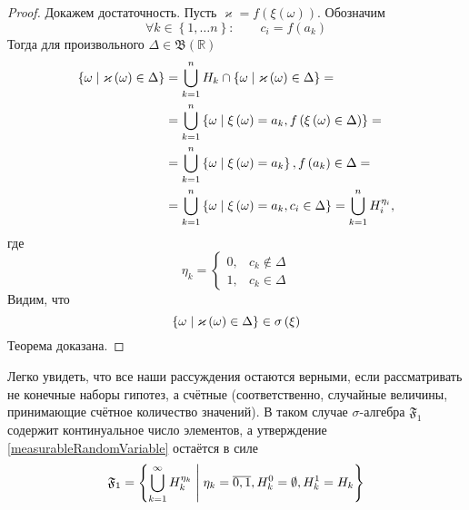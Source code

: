 \begin{proof}
  Докажем достаточность.
  Пусть $\varkappa = f\left( \xi\left( \omega \right) \right)$.
  Обозначим
  \begin{equation*}
    \forall k \in \left\{ 1, \dots n \right\}:\qquad
    c_i = f\left( a_k \right)
  \end{equation*}
  Тогда для произвольного $\Delta \in \mathfrak{B}\left( \mathbb{R} \right)$
  \begin{equation*}
    \begin{split}
      \left\{ \omega \;\middle|\; \varkappa\left( \omega \right) \in \Delta \right\}
      &= \bigcup_{k=1}^n H_k \cap 
        \left\{ \omega \;\middle|\; \varkappa\left( \omega \right)
          \in \Delta \right\} = \\
      &= \bigcup_{k=1}^n \left\{ \omega \;\middle|\;
        \xi\left( \omega \right) = a_k,
        f\left( \xi\left( \omega \right) \in \Delta \right) \right\} = \\
      &= \bigcup_{k=1}^n \left\{ \omega \;\middle|\;
        \xi\left( \omega \right) = a_k \right\},
        f\left( a_k \right) \in \Delta = \\
      &= \bigcup_{k=1}^n \left\{ \omega \;\middle|\;
        \xi\left( \omega \right) = a_k, c_i \in \Delta \right\}
      = \bigcup_{k=1}^n H_i^{\eta_i},
    \end{split}
  \end{equation*}
  где
  \begin{equation*}
    \eta_k = \begin{cases}
      0,& c_k \notin \Delta \\
      1,& c_k \in \Delta
    \end{cases}
  \end{equation*}
  Видим, что
  \begin{equation*}
    \left\{ \omega \;\middle|\; \varkappa\left( \omega \right) \in \Delta \right\}
      \in \sigma\left( \xi \right)
  \end{equation*}
  Теорема доказана.
\end{proof}

Легко увидеть, что все наши рассуждения остаются верными, если рассматривать не
конечные наборы гипотез, а счётные (соответственно, случайные величины,
принимающие счётное количество значений).
В таком случае $\sigma$-алгебра $\mathfrak{F}_1$ содержит континуальное число
элементов, а утверждение \ref{measurableRandomVariable} остаётся в силе
\begin{equation*}
  \mathfrak{F}_1
  = \left\{ \bigcup_{k=1}^{\infty} H_k^{\eta_k} \;\middle|\;
    \eta_k = \overline{0, 1}, H_k^0 = \emptyset, H_k^1 = H_k \right\}
\end{equation*}

